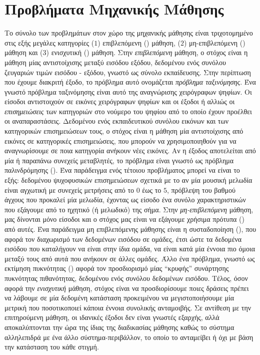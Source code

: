 \section{Προβλήματα Μηχανικής Μάθησης}
Το σύνολο των προβλημάτων στον χώρο της μηχανικής μάθησης είναι τριχοτομημένο στις εξής μεγάλες κατηγορίες ($1$) επιβλεπόμενη () μάθηση, ($2$) μη-επιβλεπόμενη () μάθηση και ($3$) ενισχυτική () μάθηση. 
Στην \textit{επιβλεπόμενη} μάθηση, ο στόχος είναι η μάθηση μίας αντιστοίχισης μεταξύ εισόδου εξόδου, δεδομένου ενός συνόλου ζευγαριών τιμών εισόδου - εξόδου, γνωστό ως σύνολο εκπαίδευσης.
Στην περίπτωση που έχουμε διακριτή έξοδο, το πρόβλημα αυτό ονομάζεται \textit{πρόβλημα ταξινόμησης}.
Ένα γνωστό πρόβλημα ταξινόμησης είναι αυτό της αναγνώρισης χειρόγραφων ψηφίων.
Οι είσοδοι αντιστοιχούν σε εικόνες χειρόγραφων ψηφίων και οι έξοδοι ή αλλιώς οι \textit{επισημειώσεις} των κατηγοριών στο νούμερο του ψηφίου από το οποίο έχουν προέλθει οι αναπαραστάσεις.
Δεδομένου ενός εκπαιδευτικού συνόλου εικόνων και των κατηγορικών επισημειώσεων τους, ο στόχος είναι η μάθηση μία αντιστοίχισης από εικόνες σε κατηγορικές επισημειώσεις, που μπορούν να χρησιμοποιηθούν για να αναγνωρίσουμε σε ποια κατηγορία ανήκουν νέες εικόνες.
Αν η έξοδος αποτελείται από μία ή παραπάνω συνεχείς μεταβλητές, το πρόβλημα είναι γνωστό ως πρόβλημα παλινδρόμησης ().
Ένα παράδειγμα ενός τέτοιου προβλήματος μπορεί να είναι το εξής: δεδομένου ψυχοφυσικών επισημειώσεων σχετικά με το αν μία μουσική μελωδία είναι αγχωτική με συνεχείς μετρήσεις από το $0$ έως το $5$, πρόβλεψη του βαθμού άγχους που προκαλεί μία μελωδία, έχοντας ως είσοδο ένα συνόλο χαρακτηριστικών που εξάγουμε από το ηχητικό (ή μελωδικό) της σήμα.
Στην \textit{μη-επιβλεπόμενη} μάθηση, μας δίνονται μόνο είσοδοι και ο στόχος μας είναι να εξάγουμε χρήσιμα πρότυπα () από αυτές.
Ένα παράδειγμα μη επιβλεπόμενης μάθησης είναι η συσταδοποίηση (), που αφορά τον διαχωρισμό των δεδομένων εισόδου σε ομάδες, έτσι ώστε τα δεδομένα εισόδου που καταλήγουν να είναι στην ίδια ομάδα, να είναι κατά μία έννοια πιο όμοια μεταξύ τους από αυτά που ανήκουν σε άλλες ομάδες.
Άλλο ένα πρόβλημα, γνωστό ως εκτίμηση πυκνότητας () αφορά τον προσδιορισμό μίας ``κρυφής'' συνάρτησης πυκνότητας πιθανότητας, δεδομένου ενός συνόλου δεδομένων εισόδου.
Τέλος, όσον αφορά την \textit{ενισχυτική} μάθηση, στόχος είναι να προσδιορίσουμε ποιες δράσεις πρέπει να λάβουμε σε μία δεδομένη κατάσταση προκειμένου να μεγιστοποιήσουμε μία μετρική που ποσοτικοποιεί κάποια έννοια συνολικής ανταμοιβής.
Σε αντίθεση με την επιτηρούμενη μάθηση, οι ιδανικές έξοδοι δεν είναι γνωστές εξαρχής, αλλά αποκαλύπτονται την ώρα της ίδιας της διαδικασίας μάθησης καθώς το σύστημα αλληλεπιδρά με ένα άλλο σύστημα-περιβάλλον, το οποίο το ανταμείβει ή όχι με βάση την κατάσταση του κάθε στιγμή.
